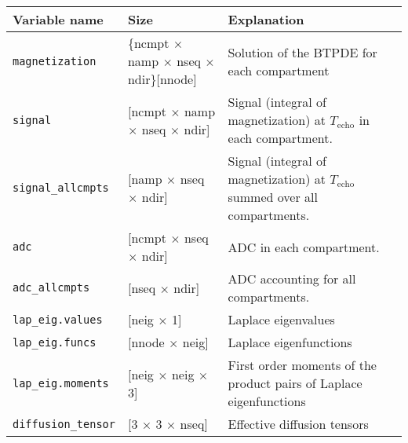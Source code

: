 \begin{tabular}{|l|l|p{5cm}|} \hline
    Variable name          & Size                                                       & Explanation                                                                         \\ \hline
    \verb+magnetization+ & \{ncmpt $\times$ namp $\times$ nseq $\times$ ndir\}[nnode] & Solution of the BTPDE for each compartment                                          \\ \hline
    \verb+signal+ & [ncmpt $\times$ namp $\times$ nseq $\times$ ndir]          & Signal (integral of magnetization) at $T_\text{echo}$ in each compartment.          \\ \hline
    \verb+signal_allcmpts+ & [namp $\times$ nseq $\times$ ndir]                         & Signal (integral of magnetization) at $T_\text{echo}$ summed over all compartments. \\ \hline
    \verb+adc+ & [ncmpt $\times$ nseq $\times$ ndir]                        & ADC in each compartment.                                                            \\ \hline
    \verb+adc_allcmpts+ & [nseq $\times$ ndir]                                       & ADC accounting for all compartments.                                                \\ \hline
    \verb+lap_eig.values+ & [neig $\times$ 1]                                          & Laplace eigenvalues                                                                 \\ \hline
    \verb+lap_eig.funcs+ & [nnode $\times$ neig]                                      & Laplace eigenfunctions                                                              \\ \hline
    \verb+lap_eig.moments+ & [neig $\times$ neig $\times$ 3]                            & First order moments of the product pairs of Laplace eigenfunctions                  \\ \hline
    \verb+diffusion_tensor+ & [3 $\times$ 3 $\times$ nseq]                               & Effective diffusion tensors                                                         \\ \hline
\end{tabular}
